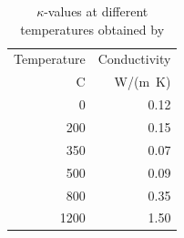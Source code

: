 \begin{table} 
	\caption{$\kappa$-values at different temperatures obtained by \citeauthor{Koning:1999}}
	\label{tablekoning}
	\centering
	\begin{tabular}{ r r }
	\toprule
	Temperature & Conductivity\\
	{\textdegree}C & W/(m\ K)\\
	\midrule
	0&0.12\\
	200&0.15\\
	350&0.07\\
	500&0.09\\
	800&0.35\\
	1200&1.50\\
	\bottomrule
	\end{tabular}
\end{table}

